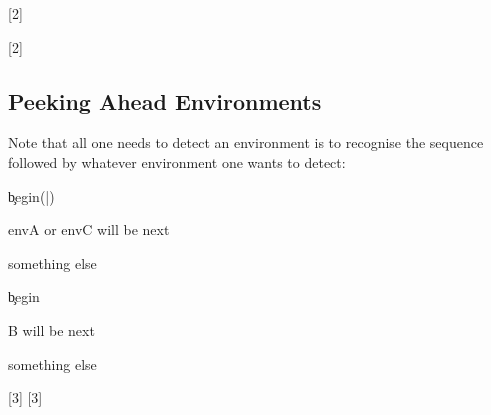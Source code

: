 \documentclass[10pt]{article}
\begin{document}
[2]


\begin{codestore}[demoA]

  
  
\end{codestore}

[2]

\subsection{Peeking Ahead Environments}

Note that all one needs to detect  an environment is to recognise the sequence  followed by whatever environment one wants to detect:

\begin{codestore}[cmd-defs]
\xpeekSetCmd{\detectEnvAC}
  {\c{begin}(|)}
  {\hspace{5mm} envA or envC will be next\par}
  {\hspace{5mm} something else\par}

\xpeekSetCmd{\detectEnvB}
  {\c{begin}}
  {\hspace{5mm} B will be next\par}
  {\hspace{5mm} something else\par}
\end{codestore}
[3]
[3]
\end{document}
